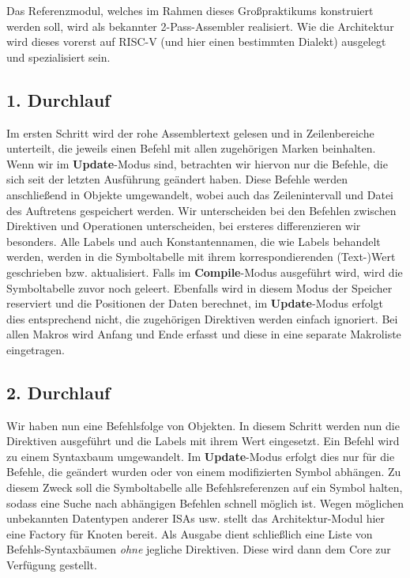 Das Referenzmodul, welches im Rahmen dieses Großpraktikums konstruiert werden
soll, wird als bekannter 2-Pass-Assembler realisiert. Wie die Architektur wird
dieses vorerst auf RISC-V (und hier einen bestimmten Dialekt) ausgelegt und
spezialisiert sein.

\subsection{1. Durchlauf}

Im ersten Schritt wird der rohe Assemblertext gelesen und in Zeilenbereiche
unterteilt, die jeweils einen Befehl mit allen zugehörigen Marken beinhalten.
Wenn wir im \textbf{Update}-Modus sind, betrachten wir hiervon nur die Befehle, die sich seit der letzten Ausführung geändert haben.
Diese Befehle werden anschließend in Objekte umgewandelt, wobei auch das Zeilenintervall und Datei des Auftretens gespeichert werden. Wir unterscheiden bei den Befehlen zwischen Direktiven und Operationen unterscheiden, bei ersteres differenzieren wir besonders. Alle Labels und auch Konstantennamen, die wie Labels behandelt werden, werden in die Symboltabelle mit ihrem
korrespondierenden (Text-)Wert geschrieben bzw. aktualisiert. Falls im \textbf{Compile}-Modus ausgeführt wird, wird die Symboltabelle zuvor noch geleert. Ebenfalls wird in diesem Modus der Speicher reserviert
und die Positionen der Daten berechnet, im \textbf{Update}-Modus erfolgt dies entsprechend nicht, die zugehörigen Direktiven werden einfach ignoriert.  Bei allen Makros wird Anfang und Ende erfasst und diese in eine separate Makroliste eingetragen.

\subsection{2. Durchlauf}

Wir haben nun eine Befehlsfolge von Objekten. In diesem Schritt werden nun die
Direktiven ausgeführt und die Labels mit ihrem Wert eingesetzt. Ein Befehl wird
zu einem Syntaxbaum umgewandelt. Im \textbf{Update}-Modus erfolgt dies nur für die Befehle, die geändert wurden oder von einem modifizierten Symbol abhängen. Zu diesem Zweck soll die Symboltabelle alle Befehlsreferenzen auf ein Symbol halten, sodass eine Suche nach abhängigen Befehlen schnell möglich ist.
Wegen möglichen unbekannten Datentypen anderer ISAs usw. stellt das Architektur-Modul hier eine Factory für
Knoten bereit.  Als Ausgabe dient schließlich eine
Liste von Befehls-Syntaxbäumen \emph{ohne} jegliche Direktiven. Diese wird dann dem Core zur Verfügung gestellt.

